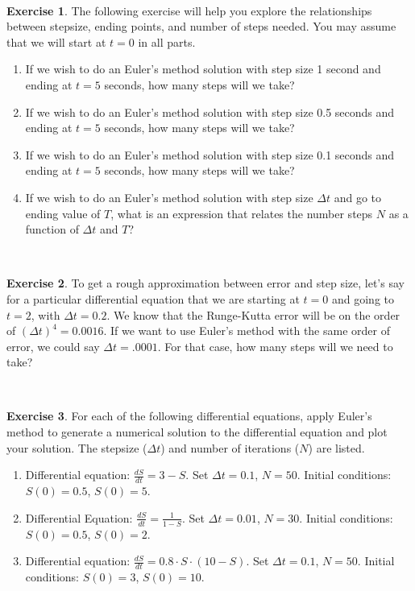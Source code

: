 \documentclass[
]{book}
\theoremstyle{definition}
\theoremstyle{definition}
\theoremstyle{definition}
\newtheorem{exercise}{Exercise}[chapter]
\theoremstyle{remark}
\begin{document}
~

\begin{exercise}
\protect\hypertarget{exr:unnamed-chunk-69}{}{\label{exr:unnamed-chunk-69} }The following exercise will help you explore the relationships between stepsize, ending points, and number of steps needed. You may assume that we will start at \(t=0\) in all parts.

\begin{enumerate}[label=\alph*.]
\item If we wish to do an Euler's method solution with step size 1 second and ending at $t=5$ seconds, how many steps will we take?
\item If we wish to do an Euler's method solution with step size 0.5 seconds and ending at $t=5$ seconds, how many steps will we take?
\item If we wish to do an Euler's method solution with step size 0.1 seconds and ending at $t=5$ seconds, how many steps will we take?
\item If we wish to do an Euler's method solution with step size $\Delta t$ and go to ending value of $T$, what is an expression that relates the number steps $N$ as a function of $\Delta t$ and $T$?
\end{enumerate}
\end{exercise}

~

\begin{exercise}
\protect\hypertarget{exr:unnamed-chunk-70}{}{\label{exr:unnamed-chunk-70} }To get a rough approximation between error and step size, let's say for a particular differential equation that we are starting at \(t=0\) and going to \(t=2\), with \(\Delta t = 0.2\). We know that the Runge-Kutta error will be on the order of \((\Delta t)^{4} =0.0016\). If we want to use Euler's method with the same order of error, we could say \(\Delta t = .0001\). For that case, how many steps will we need to take?
\end{exercise}

~

\begin{exercise}
\protect\hypertarget{exr:euler-solve}{}{\label{exr:euler-solve} }For each of the following differential equations, apply Euler's method to generate a numerical solution to the differential equation and plot your solution. The stepsize (\(\Delta t\)) and number of iterations (\(N\)) are listed.

\begin{enumerate}[label=\alph*.]
\item Differential equation: $\displaystyle \frac{dS}{dt} =3-S$. Set $\Delta t = 0.1$, $N = 50$. Initial conditions:  $S(0) = 0.5$, $S(0) = 5$.
\item Differential Equation: $\displaystyle \frac{dS}{dt} =\frac{1}{1-S}$. Set $\Delta t = 0.01$, $N = 30$. Initial conditions:  $S(0) = 0.5$, $S(0) = 2$.
\item Differential equation: $\displaystyle \frac{dS}{dt} = 0.8 \cdot S \cdot (10-S)$. Set $\Delta t = 0.1$, $N = 50$. Initial conditions:  $S(0) = 3$, $S(0) = 10$.
\end{enumerate}
\end{exercise}
\end{document}
